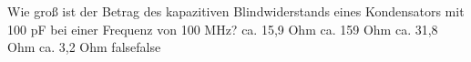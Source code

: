    {Wie groß ist der Betrag des kapazitiven Blindwiderstands eines Kondensators mit 100 pF bei einer Frequenz von 100 MHz?}
    {ca. 15,9 Ohm}
    {ca. 159 Ohm}
    {ca. 31,8 Ohm}
    {ca. 3,2 Ohm}
    {false}{false}